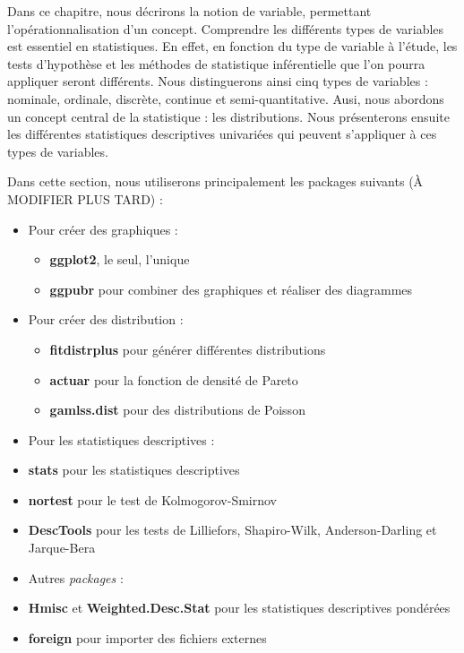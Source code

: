 \documentclass[
  11pt,
  french,
]{book}
\makeatletter
\providecommand{\tightlist}{%
  \setlength{\itemsep}{0pt}\setlength{\parskip}{0pt}}
\newenvironment{kframev}{%
\medskip{}
\setlength{\fboxsep}{.8em}
 \def\at@end@of@kframev{}%
 \ifinner\ifhmode%
  \def\at@end@of@kframev{\end{minipage}}%
  \begin{minipage}{\columnwidth}%
 \fi\fi%
 \def\FrameCommand##1{\hskip\@totalleftmargin \hskip-\fboxsep
 \colorbox{shadebluecolor}{##1}\hskip-\fboxsep
     \hskip-\linewidth \hskip-\@totalleftmargin \hskip\columnwidth}%
 \MakeFramed {\advance\hsize-\width
   \@totalleftmargin\z@ \linewidth\hsize
   \@setminipage}}%
 {\par\unskip\endMakeFramed%
 \at@end@of@kframev}
\newenvironment{rmdblock}[1]
  {
  \begin{itemize}
  \renewcommand{\labelitemi}{
    \raisebox{-.7\height}[0pt][0pt]{
      {\setkeys{Gin}{width=3em,keepaspectratio}\texttt{[image: images/\#1]}}
    }
  }
  \setlength{\fboxsep}{1em}
  \begin{kframev}
  \small
  \item
  }
  {
  \end{kframev}
  \end{itemize}
  }
\newenvironment{bloc_package}
  {\begin{rmdblock}{package}}
  {\end{rmdblock}}
\makeatother
\begin{document}
Dans ce chapitre, nous décrirons la notion de variable, permettant l'opérationnalisation d'un concept. Comprendre les différents types de variables est essentiel en statistiques. En effet, en fonction du type de variable à l'étude, les tests d'hypothèse et les méthodes de statistique inférentielle que l'on pourra appliquer seront différents. Nous distinguerons ainsi cinq types de variables : nominale, ordinale, discrète, continue et semi-quantitative. Ausi, nous abordons un concept central de la statistique : les distributions. Nous présenterons ensuite les différentes statistiques descriptives univariées qui peuvent s'appliquer à ces types de variables.

\begin{bloc_package}

Dans cette section, nous utiliserons principalement les packages suivants (À MODIFIER PLUS TARD) :

\begin{itemize}
\item
  Pour créer des graphiques :

  \begin{itemize}
  \tightlist
  \item
    \textbf{ggplot2}, le seul, l'unique
  \item
    \textbf{ggpubr} pour combiner des graphiques et réaliser des diagrammes
  \end{itemize}
\item
  Pour créer des distribution :

  \begin{itemize}
  \tightlist
  \item
    \textbf{fitdistrplus} pour générer différentes distributions
  \item
    \textbf{actuar} pour la fonction de densité de Pareto
  \item
    \textbf{gamlss.dist} pour des distributions de Poisson
  \end{itemize}
\item
  Pour les statistiques descriptives :
\item
  \textbf{stats} pour les statistiques descriptives
\item
  \textbf{nortest} pour le test de Kolmogorov-Smirnov
\item
  \textbf{DescTools} pour les tests de Lilliefors, Shapiro-Wilk, Anderson-Darling et Jarque-Bera
\item
  Autres \emph{packages} :
\item
  \textbf{Hmisc} et \textbf{Weighted.Desc.Stat} pour les statistiques descriptives pondérées
\item
  \textbf{foreign} pour importer des fichiers externes
\end{itemize}

\end{bloc_package}
\end{document}
